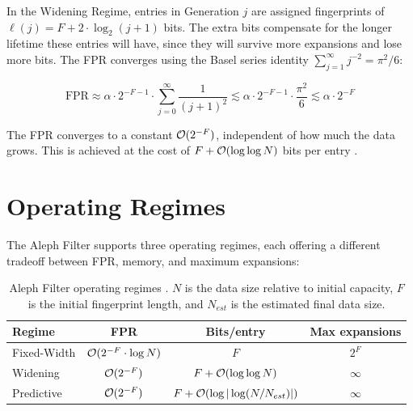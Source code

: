 In the Widening Regime, entries in Generation $j$ are assigned 
fingerprints of $\ell(j) = F + 2 \cdot \log_2(j + 1)$ bits. The 
extra bits compensate for the longer lifetime these entries will 
have, since they will survive more expansions and lose more bits. 
The FPR converges using the Basel series identity 
$\sum_{j=1}^{\infty} j^{-2} = \pi^2/6$:

\begin{equation}
  \text{FPR} \approx \alpha \cdot 2^{-F-1} \cdot 
  \sum_{j=0}^{\infty} \frac{1}{(j+1)^2} 
  \lesssim \alpha \cdot 2^{-F-1} \cdot \frac{\pi^2}{6} 
  \lesssim \alpha \cdot 2^{-F}
  \label{eq:aleph-fpr-widening}
\end{equation}

The FPR converges to a constant $\mathcal{O}(2^{-F})$, independent of how 
much the data grows. This is achieved at the cost of $F + \mathcal{O}(\log 
\log N)$ bits per entry \cite{aleph}.


\section{Operating Regimes}
\label{sec:regimes}

The Aleph Filter supports three operating regimes, each offering a 
different tradeoff between FPR, memory, and maximum expansions:

\begin{table}[H]
  \centering
  \caption{Aleph Filter operating regimes \cite{aleph}. $N$ is the data 
           size relative to initial capacity, $F$ is the initial 
           fingerprint length, and $N_{est}$ is the estimated final 
           data size.}
  \label{tab:regimes}
  \begin{tabular}{l c c c}
    \hline
    \textbf{Regime} & \textbf{FPR} & \textbf{Bits/entry} & 
    \textbf{Max expansions} \\
    \hline
    Fixed-Width & $\mathcal{O}(2^{-F} \cdot \log N)$ & $F$ & $2^F$ \\
    Widening & $\mathcal{O}(2^{-F})$ & $F + \mathcal{O}(\log \log N)$ & $\infty$ \\
    Predictive & $\mathcal{O}(2^{-F})$ & $F + \mathcal{O}(\log|\log(N/N_{est})|)$ 
    & $\infty$ \\
    \hline
  \end{tabular}
\end{table}

